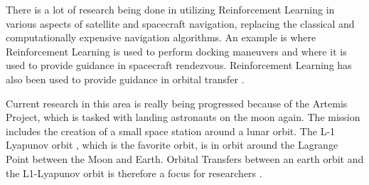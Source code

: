 There is a lot of research being done in utilizing Reinforcement Learning in various aspects of satellite and spacecraft navigation, replacing the classical and computationally expensive navigation algorithms. An example is \cite{oestreich2020autonomous} where Reinforcement Learning is used to perform docking maneuvers and \cite{broida2019spacecraft} where it is used to provide guidance in spacecraft rendezvous. Reinforcement Learning has also been used to provide guidance in orbital transfer \cite{miller2019low}.

Current research in this area is really being progressed because of the Artemis Project, which is tasked with landing astronauts on the moon again. The mission includes the creation of a small space station around a lunar orbit. The L-1 Lyapunov orbit \cite{rubinsztejn_2019}, which is the favorite orbit, is in orbit around the Lagrange Point between the Moon and Earth. Orbital Transfers between an earth orbit and the L1-Lyapunov orbit is therefore a focus for researchers \cite{sullivan2020using, lafarge2020guidance, lafarge2020autonomous}. 
